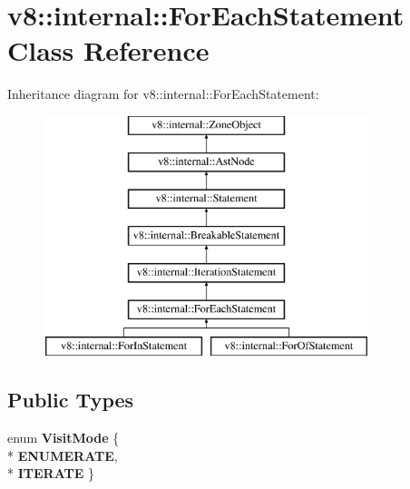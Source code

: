\hypertarget{classv8_1_1internal_1_1_for_each_statement}{}\section{v8\+:\+:internal\+:\+:For\+Each\+Statement Class Reference}
\label{classv8_1_1internal_1_1_for_each_statement}
Inheritance diagram for v8\+:\+:internal\+:\+:For\+Each\+Statement\+:\begin{figure}[H]
\begin{center}
\leavevmode
\includegraphics[height=7.000000cm]{classv8_1_1internal_1_1_for_each_statement}
\end{center}
\end{figure}
\subsection*{Public Types}
\begin{DoxyCompactItemize}
\item 
enum {\bfseries Visit\+Mode} \{ \\*
{\bfseries E\+N\+U\+M\+E\+R\+A\+TE}, 
\\*
{\bfseries I\+T\+E\+R\+A\+TE}
 \}\hypertarget{classv8_1_1internal_1_1_for_each_statement_a082216e3ae801be313df6eb024ffa17f}{}\label{classv8_1_1internal_1_1_for_each_statement_a082216e3ae801be313df6eb024ffa17f}

\end{DoxyCompactItemize}
